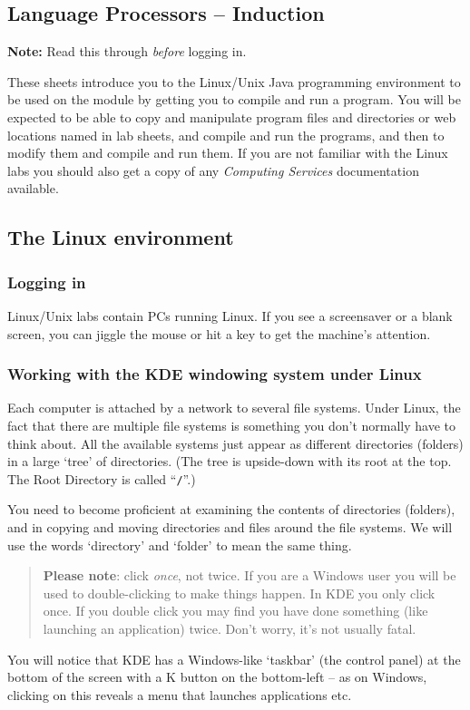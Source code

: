 \documentclass{article}
\begin{document}
\subsection*{Language Processors -- Induction}

{\bf Note:} Read this through {\em before\/} logging in.

\medskip\noindent These sheets
introduce you to the Linux/Unix Java programming environment to 
be used on the module by getting you to compile and run a program.
You will be expected to be able to copy and 
manipulate program files and directories or web locations
named in lab sheets, and compile and run the programs, 
and then to modify them and compile and run them.
If you are not familiar with the Linux labs you should also get a copy of any
\emph{Computing Services} documentation available.


\subsection*{The Linux environment}

\subsubsection*{Logging in}

Linux/Unix labs contain PCs running Linux.
If you see a screensaver or a blank screen,
you can jiggle the mouse or hit
a key to get the machine's attention.



\subsubsection*{Working with the KDE windowing system under Linux}

Each computer is attached by a network to several file systems. Under
Linux, the fact that there are multiple file systems is something
you don't normally have to think about. All the available systems
just appear as different directories (folders) in a large
`tree' of directories.
(The tree is upside-down with its root at the top. The Root
Directory is called ``{\tt /}''.)

You need to become proficient at examining the contents of
directories (folders), and in copying and moving
directories and files around the file systems.
We will use the words `directory' and `folder'
to mean the same thing.

\begin{quote}
{\bf Please note}: click \emph{once}, not twice. If you are a Windows
user you will be used to double-clicking to make things happen. In KDE
you only click once. If you double click you may find you have done something
(like launching an application) twice. Don't worry, it's not usually fatal.
\end{quote}
You will notice that KDE has a Windows-like `taskbar' (the control panel)
at the bottom
of the screen with a K button 
on the bottom-left -- as on Windows, clicking on this
reveals a menu that launches applications etc.
\end{document}
